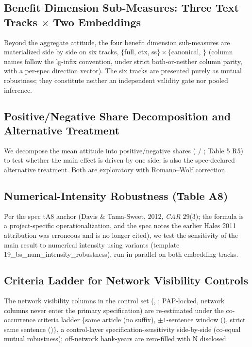 \subsection{Benefit Dimension Sub-Measures: Three Text Tracks $\times$ Two Embeddings}\label{sec:robust:dims}
Beyond the aggregate attitude, the four benefit dimension sub-measures
are materialized side by side on six tracks, $\{$full, ctx, ss$\}
\times \{$canonical, $\}$ (column names follow the
lg-infix convention, under strict both-or-neither column parity, with a
per-spec direction vector). The six tracks are presented purely as
mutual robustness; they constitute neither an independent validity gate
nor pooled inference.

\subsection{Positive/Negative Share Decomposition and Alternative Treatment}\label{sec:robust:decomp}
We decompose the mean attitude into positive/negative shares
( / ;
Table 5 R5) to test whether the main effect is driven by one side;
 is also the spec-declared alternative
treatment. Both are exploratory with Romano--Wolf correction.

\subsection{Numerical-Intensity Robustness (Table A8)}\label{sec:robust:numint}
Per the spec tA8 anchor (Davis \& Tama-Sweet, 2012, \emph{CAR} 29(3);
the formula is a project-specific operationalization, and the spec
notes the earlier Hales 2011 attribution was erroneous and is no longer
cited), we test the sensitivity of the main result to numerical
intensity using  variants (template
19\_bs\_num\_intensity\_robustness), run in parallel on both embedding
tracks. 

\subsection{Criteria Ladder for Network Visibility Controls}\label{sec:robust:netcrit}
The network visibility columns in the control set
(, ; PAP-locked,
network columns never enter the primary specification) are re-estimated
under the co-occurrence criteria ladder $\{$same article (no suffix),
$\pm 1$-sentence window (), strict same sentence
()$\}$, a control-layer specification-sensitivity
side-by-side (co-equal mutual robustness); off-network bank-years are
zero-filled with N disclosed.

